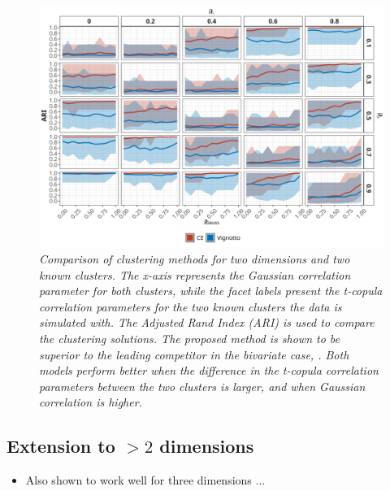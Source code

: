 \documentclass{article}
\numberwithin{equation}{section}
\begin{document}
\begin{itemize}
\begin{figure}[H]
    \centering
    \includegraphics[width = 0.9\linewidth]{plots/sim_01b_ce_vs_vi_dqu_0.9.png}
    \caption{\emph{Comparison of clustering methods for two dimensions and two known clusters. The x-axis represents the Gaussian correlation parameter for both clusters, while the facet labels present the t-copula correlation parameters for the two known clusters the data is simulated with. The Adjusted Rand Index (ARI) is used to compare the clustering solutions. The proposed method is shown to be superior to the leading competitor in the bivariate case, \cite{Vignotto2021}. Both models perform better when the difference in the t-copula correlation parameters between the two clusters is larger, and when Gaussian correlation is higher.}}
    \label{fig:01_ce_vs_vi}
\end{figure}


\subsection{Extension to $>2$ dimensions} \label{subsec:sim_extension}

\begin{itemize}
    \item Also shown to work well for three dimensions ...
\end{itemize}


\end{itemize}
\end{document}
